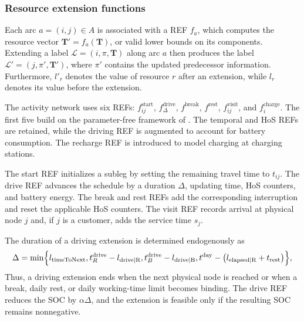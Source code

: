 \documentclass[3p,11pt,authoryear]{elsarticle}  %
\begin{document}




\subsubsection{Resource extension functions}





Each arc \(a=(i,j)\in A\) is associated with a REF \(f_a\), which computes the resource vector \(\mathbf{T}'=f_a(\mathbf{T})\), or valid lower bounds on its components. %
Extending a label \(\mathcal{L}=(i,\pi,\mathbf{T})\) along arc \(a\) then produces the label \(\mathcal{L}'=(j,\pi',\mathbf{T}')\), where \(\pi'\) contains the updated predecessor information. Furthermore, \(l'_r\) denotes the value of resource \(r\) after an extension, while \(l_r\) denotes its value before the extension.

The activity network uses six REFs: \(f^{\text{start}}_{ij}\), \(f^{\text{drive}}_{\Delta}\), \(f^{\text{break}}\), \(f^{\text{rest}}\), \(f^{\text{visit}}_{ij}\), and \(f^{\text{charge}}_i\). The first five build on the parameter-free framework of \citet{goel2017exact}. The temporal and HoS REFs are retained, while the driving REF is augmented to account for battery consumption. The recharge REF is introduced to model charging at charging stations.

The start REF initializes a subleg by setting the remaining travel time to \(t_{ij}\). The drive REF advances the schedule by a duration \(\Delta\), updating time, HoS counters, and battery energy. The break and rest REFs add the corresponding interruption and reset the applicable HoS counters. The visit REF records arrival at physical node \(j\) and, if \(j\) is a customer, adds the service time \(s_j\).

The duration of a driving extension is determined endogenously as
\[
\Delta = \min\Bigl\{
l_{\text{timeToNext}},
t_{R}^{\text{drive}}-l_{\text{drive|R}},
t_{B}^{\text{drive}}-l_{\text{drive|B}},
t^{\text{day}}-\bigl(l_{\text{elapsed|R}}+t_{\text{rest}}\bigr)
\Bigr\},
\]
Thus, a driving extension ends when the next physical node is reached or when a break, daily rest, or daily working-time limit becomes binding. The drive REF reduces the SOC by \(\alpha\Delta\), and the extension is feasible only if the resulting SOC remains nonnegative.
\end{document}
